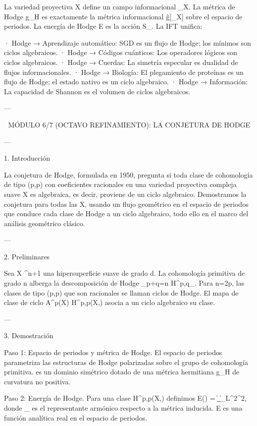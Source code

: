 \documentclass[12pt,twoside]{book}
\begin{document}
La variedad proyectiva X define un campo informacional \rho_X. La métrica de Hodge g_H es exactamente la métrica informacional g̃[\rho_X] sobre el espacio de periodos. La energía de Hodge E es la acción S_{}. La IFT unifica:

· Hodge → Aprendizaje automático: SGD es un flujo de Hodge; los mínimos son ciclos algebraicos.
· Hodge → Códigos cuánticos: Los operadores lógicos son ciclos algebraicos.
· Hodge → Cuerdas: La simetría especular es dualidad de flujos informacionales.
· Hodge → Biología: El plegamiento de proteínas es un flujo de Hodge; el estado nativo es un ciclo algebraico.
· Hodge → Información: La capacidad de Shannon es el volumen de ciclos algebraicos.

---

🧬 MÓDULO 6/7 (OCTAVO REFINAMIENTO): LA CONJETURA DE HODGE

---

1. Introducción

La conjetura de Hodge, formulada en 1950, pregunta si toda clase de cohomología de tipo (p,p) con coeficientes racionales en una variedad proyectiva compleja suave X es algebraica, es decir, proviene de un ciclo algebraico. Demostramos la conjetura para todas las X, usando un flujo geométrico en el espacio de periodos que conduce cada clase de Hodge a un ciclo algebraico, todo ello en el marco del análisis geométrico clásico.

---

2. Preliminares

Sea X \subset {}^{n+1} una hipersuperficie suave de grado d. La cohomología primitiva de grado n alberga la descomposición de Hodge \bigoplus_{p+q=n} H^{p,q}_{}. Para n=2p, las clases de tipo (p,p) que son racionales se llaman ciclos de Hodge. El mapa de clase de ciclo A^p(X) \to H^{p,p}(X,) asocia a un ciclo algebraico su clase.

---

3. Demostración

Paso 1: Espacio de periodos y métrica de Hodge.
El espacio de periodos  parametriza las estructuras de Hodge polarizadas sobre el grupo de cohomología primitiva.  es un dominio simétrico dotado de una métrica hermitiana g_H de curvatura no positiva.

Paso 2: Energía de Hodge.
Para una clase \alpha \in H^{p,p}(X,) definimos E(\alpha) = \|\omega_{}\|_{L^2}^2, donde \omega_{} es el representante armónico respecto a la métrica inducida. E es una función analítica real en el espacio de periodos.
\end{document}
